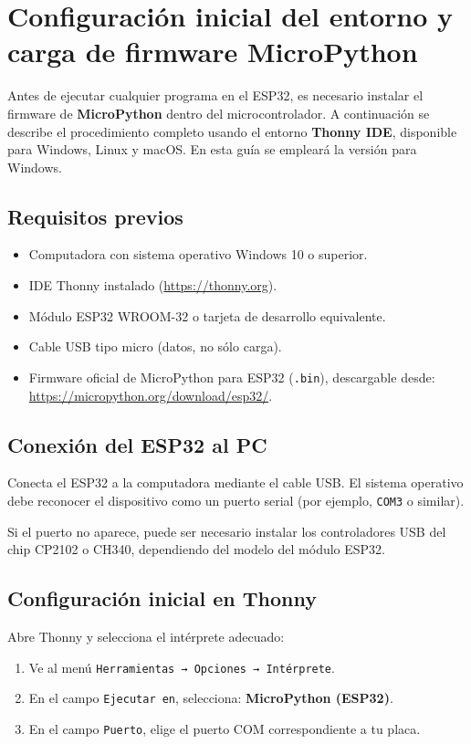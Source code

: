 \documentclass[a4paper,12pt]{article}
\begin{document}
\section{Configuración inicial del entorno y carga de firmware MicroPython}

Antes de ejecutar cualquier programa en el ESP32, es necesario instalar el firmware de \textbf{MicroPython} dentro del microcontrolador. A continuación se describe el procedimiento completo usando el entorno \textbf{Thonny IDE}, disponible para Windows, Linux y macOS. En esta guía se empleará la versión para Windows.

\subsection{Requisitos previos}
\begin{itemize}
  \item Computadora con sistema operativo Windows 10 o superior.
  \item IDE Thonny instalado (\url{https://thonny.org}).
  \item Módulo ESP32 WROOM-32 o tarjeta de desarrollo equivalente.
  \item Cable USB tipo micro (datos, no sólo carga).
  \item Firmware oficial de MicroPython para ESP32 (\texttt{.bin}), descargable desde:
  \url{https://micropython.org/download/esp32/}.
\end{itemize}

\subsection{Conexión del ESP32 al PC}
Conecta el ESP32 a la computadora mediante el cable USB.  
El sistema operativo debe reconocer el dispositivo como un puerto serial (por ejemplo, \texttt{COM3} o similar).

Si el puerto no aparece, puede ser necesario instalar los controladores USB del chip CP2102 o CH340, dependiendo del modelo del módulo ESP32.

\subsection{Configuración inicial en Thonny}
Abre Thonny y selecciona el intérprete adecuado:

\begin{enumerate}
  \item Ve al menú \texttt{Herramientas → Opciones → Intérprete}.
  \item En el campo \texttt{Ejecutar en}, selecciona: \textbf{MicroPython (ESP32)}.
  \item En el campo \texttt{Puerto}, elige el puerto COM correspondiente a tu placa.
\end{enumerate}
\end{document}
